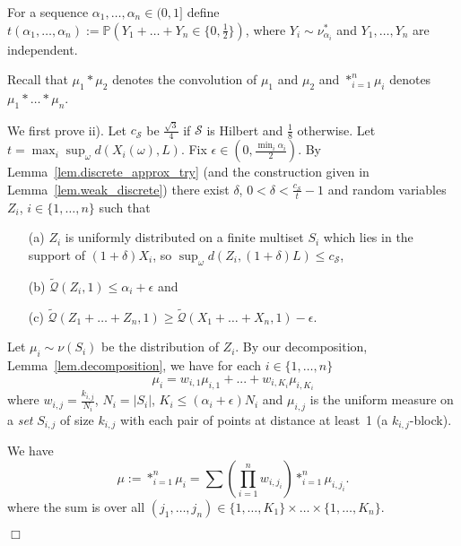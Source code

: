 \documentclass{article}
\newenvironment{proofof}[1]{\noindent {\bf Proof of #1}}{\hspace*{\fill}$\Box$}
\newcommand{\pr}{\mathbb P}
\newcommand{\concdiam}{\tilde{\mathcal{Q}}}
\newcommand\nuopt[1]{\nu_{#1}^*}
\begin{document}
\medskip




For a sequence $\alpha_1, \dots, \alpha_n \in (0,1]$ define $t(\alpha_1, \dots, \alpha_n):=\pr(Y_1+\dots+Y_n \in \{0, \frac 1 2\})$, where $Y_i \sim \nuopt {\alpha_i}$ and $Y_1, \dots, Y_n$ are independent. 

Recall that $\mu_1 * \mu_2$ denotes the convolution of $\mu_1$ and $\mu_2$ and $*_{i=1}^n \mu_i$ denotes $\mu_1 * \dots * \mu_n$.

\medskip

\begin{proofof}{Theorem~\ref{close_to_line}}
    We first prove ii). 
    Let $c_{\mathcal S}$ be $\frac{\sqrt 3} 4$ if $\mathcal{S}$ is Hilbert and $\frac 1 8$ otherwise. Let $t = \max_i \sup_\omega d(X_i(\omega), L)$. Fix $\epsilon \in (0, \frac {\min_i \alpha_i} 2)$. By Lemma~\ref{lem.discrete_approx_try} (and the construction given in Lemma~\ref{lem.weak_discrete}) 
there exist $\delta$, $0 < \delta < \frac {c_{\mathcal{S}}} {t} - 1$ and random variables $Z_i$, $i \in \{1, \dots, n\}$ such that 
    \begin{enumerate}
        \item[(a)] $Z_i$ is uniformly distributed on a finite multiset $S_i$ which lies in the support of $(1+\delta)X_i$, so  $\sup_\omega d(Z_i, (1+\delta)L) \le c_{\mathcal{S}}$,
        \item[(b)] $\concdiam(Z_i,1) \le \alpha_i +  \epsilon$ and
        \item[(c)] $\concdiam(Z_1 + \dots + Z_n, 1) \ge \concdiam(X_1 + \dots + X_n, 1) - \epsilon$.
\end{enumerate}            
    Let $\mu_i \sim \nu(S_i)$ be the distribution of $Z_i$.
    By our decomposition, Lemma~\ref{lem.decomposition}, we have for each $i \in \{1, \dots, n\}$
    \[
        \mu_i = w_{i,1} \mu_{i,1} + ... + w_{i,K_i} \mu_{i,K_i}
    \]
    where $w_{i,j} = \frac {k_{i,j}} {N_i}$, $N_i = |S_i|$, $K_i \le (\alpha_i + \epsilon) N_i$ and 
    $\mu_{i,j}$ is the uniform
    measure on a \emph{set} $S_{i,j}$ of size $k_{i,j}$ with each pair of points at distance at least~1 (a $k_{i,j}$-block).

    We have
    \[
        \mu:=*_{i=1}^n \mu_i = \sum \left(\prod_{i=1}^n w_{i,j_i}\right) *_{i=1}^n \mu_{i, j_i}.
    \]
    where the sum is over all $(j_1, \dots, j_n) \in \{1, \dots, K_1\} \times \dots \times \{1, \dots, K_n\}$.


\end{proofof}
\end{document}
